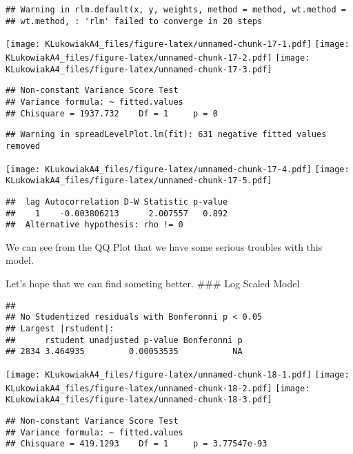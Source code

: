 \documentclass[]{article}
\begin{document}
\begin{verbatim}
## Warning in rlm.default(x, y, weights, method = method, wt.method =
## wt.method, : 'rlm' failed to converge in 20 steps
\end{verbatim}

\texttt{[image: KLukowiakA4\_files/figure-latex/unnamed-chunk-17-1.pdf]}
\texttt{[image: KLukowiakA4\_files/figure-latex/unnamed-chunk-17-2.pdf]}
\texttt{[image: KLukowiakA4\_files/figure-latex/unnamed-chunk-17-3.pdf]}

\begin{verbatim}
## Non-constant Variance Score Test 
## Variance formula: ~ fitted.values 
## Chisquare = 1937.732    Df = 1     p = 0
\end{verbatim}

\begin{verbatim}
## Warning in spreadLevelPlot.lm(fit): 631 negative fitted values removed
\end{verbatim}

\texttt{[image: KLukowiakA4\_files/figure-latex/unnamed-chunk-17-4.pdf]}
\texttt{[image: KLukowiakA4\_files/figure-latex/unnamed-chunk-17-5.pdf]}

\begin{verbatim}
##  lag Autocorrelation D-W Statistic p-value
##    1    -0.003806213      2.007557   0.892
##  Alternative hypothesis: rho != 0
\end{verbatim}

We can see from the QQ Plot that we have some serious troubles with this
model.

Let's hope that we can find someting better. \#\#\# Log Scaled Model

\begin{verbatim}
## 
## No Studentized residuals with Bonferonni p < 0.05
## Largest |rstudent|:
##      rstudent unadjusted p-value Bonferonni p
## 2834 3.464935         0.00053535           NA
\end{verbatim}

\texttt{[image: KLukowiakA4\_files/figure-latex/unnamed-chunk-18-1.pdf]}
\texttt{[image: KLukowiakA4\_files/figure-latex/unnamed-chunk-18-2.pdf]}
\texttt{[image: KLukowiakA4\_files/figure-latex/unnamed-chunk-18-3.pdf]}

\begin{verbatim}
## Non-constant Variance Score Test 
## Variance formula: ~ fitted.values 
## Chisquare = 419.1293    Df = 1     p = 3.77547e-93
\end{verbatim}
\end{document}

